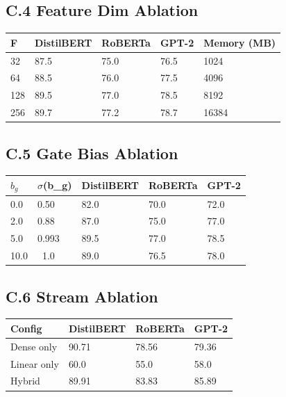 \subsection{C.4 Feature Dim Ablation}

\begin{table}[H]
\centering
\small
\begin{tabular}{lllll}
\toprule
\textbf{F} & \textbf{DistilBERT} & \textbf{RoBERTa} & \textbf{GPT-2} & \textbf{Memory (MB)} \\
\midrule
32 & 87.5 & 75.0 & 76.5 & 1024 \\
64 & 88.5 & 76.0 & 77.5 & 4096 \\
128 & 89.5 & 77.0 & 78.5 & 8192 \\
256 & 89.7 & 77.2 & 78.7 & 16384 \\
\bottomrule
\end{tabular}
\end{table}

\subsection{C.5 Gate Bias Ablation}

\begin{table}[H]
\centering
\small
\begin{tabular}{lllll}
\toprule
\textbf{$b_g$} & \textbf{$\sigma$(b\_g)} & \textbf{DistilBERT} & \textbf{RoBERTa} & \textbf{GPT-2} \\
\midrule
0.0 & 0.50 & 82.0 & 70.0 & 72.0 \\
2.0 & 0.88 & 87.0 & 75.0 & 77.0 \\
5.0 & 0.993 & 89.5 & 77.0 & 78.5 \\
10.0 & ~1.0 & 89.0 & 76.5 & 78.0 \\
\bottomrule
\end{tabular}
\end{table}

\subsection{C.6 Stream Ablation}

\begin{table}[H]
\centering
\small
\begin{tabular}{llll}
\toprule
\textbf{Config} & \textbf{DistilBERT} & \textbf{RoBERTa} & \textbf{GPT-2} \\
\midrule
Dense only & 90.71 & 78.56 & 79.36 \\
Linear only & 60.0 & 55.0 & 58.0 \\
Hybrid & 89.91 & 83.83 & 85.89 \\
\bottomrule
\end{tabular}
\end{table}

